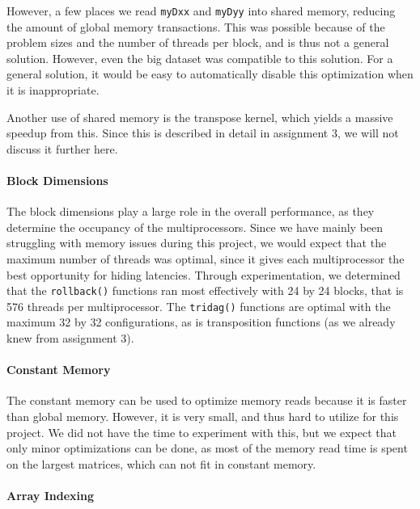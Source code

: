 \documentclass[11pt]{article}
\begin{document}
However, a few places we read \texttt{myDxx} and \texttt{myDyy} into shared memory, reducing the amount of global memory transactions.
This was possible because of the problem sizes and the number of threads per block, and is thus not a general solution.
However, even the big dataset was compatible to this solution.
For a general solution, it would be easy to automatically disable this optimization when it is inappropriate.

Another use of shared memory is the transpose kernel, which yields a massive speedup from this.
Since this is described in detail in assignment 3, we will not discuss it further here.

\paragraph{Block Dimensions\\}

The block dimensions play a large role in the overall performance, as they determine the occupancy of the multiprocessors.
Since we have mainly been struggling with memory issues during this project, we would expect that the maximum number of threads was optimal, since it gives each multiprocessor the best opportunity for hiding latencies.
Through experimentation, we determined that the \texttt{rollback()} functions ran most effectively with 24 by 24 blocks, that is 576 threads per multiprocessor.
The \texttt{tridag()} functions are optimal with the maximum 32 by 32 configurations, as is transposition functions (as we already knew from assignment 3).

\paragraph{Constant Memory\\}

The constant memory can be used to optimize memory reads because it is faster than global memory.
However, it is very small, and thus hard to utilize for this project.
We did not have the time to experiment with this, but we expect that only minor optimizations can be done, as most of the memory read time is spent on the largest matrices, which can not fit in constant memory.

\paragraph{Array Indexing\\}
\end{document}
